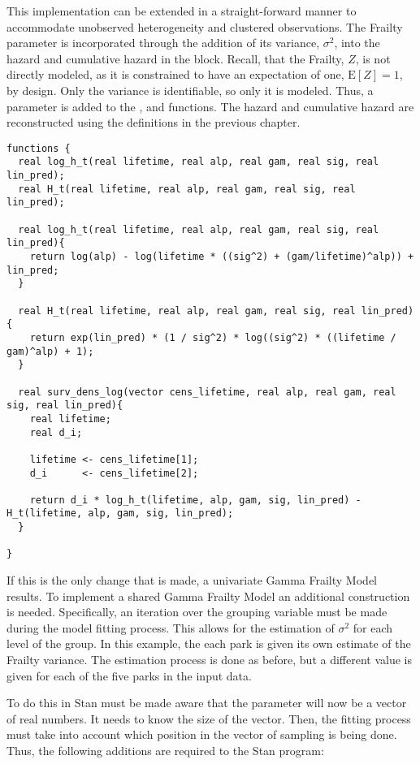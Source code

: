 This implementation can be extended in a straight-forward manner to accommodate unobserved heterogeneity and clustered observations. The Frailty parameter is incorporated through the addition of its variance, $\sigma^2$, into the hazard and cumulative hazard in the  block. Recall, that the Frailty, $Z$, is not directly modeled, as it is constrained to have an expectation of one, $\mathrm{E}[Z]=1$, by design. Only the variance is identifiable, so only it is modeled. Thus, a  parameter is added to the ,  and  functions. The hazard and cumulative hazard are reconstructed using the definitions in the previous chapter. 

\begin{lstlisting}
functions {
  real log_h_t(real lifetime, real alp, real gam, real sig, real lin_pred);
  real H_t(real lifetime, real alp, real gam, real sig, real lin_pred);
  
  real log_h_t(real lifetime, real alp, real gam, real sig, real lin_pred){
    return log(alp) - log(lifetime * ((sig^2) + (gam/lifetime)^alp)) + lin_pred;
  }
  
  real H_t(real lifetime, real alp, real gam, real sig, real lin_pred){
    return exp(lin_pred) * (1 / sig^2) * log((sig^2) * ((lifetime / gam)^alp) + 1);
  }
  
  real surv_dens_log(vector cens_lifetime, real alp, real gam, real sig, real lin_pred){
    real lifetime;
    real d_i;
    
    lifetime <- cens_lifetime[1];
    d_i      <- cens_lifetime[2];
  
    return d_i * log_h_t(lifetime, alp, gam, sig, lin_pred) - H_t(lifetime, alp, gam, sig, lin_pred);
  }

}
\end{lstlisting}


If this is the only change that is made, a univariate Gamma Frailty Model results. To implement a shared Gamma Frailty Model an additional construction is needed. Specifically, an iteration over the grouping variable must be made during the model fitting process. This allows for the estimation of $\sigma^2$ for each level of the group. In this example, the each park is given its own estimate of the Frailty variance. The estimation process is done as before, but a different value is given for each of the five parks in the input data.

To do this in Stan must be made aware that the parameter  will now be a vector of real numbers. It needs to know the size of the vector. Then, the fitting process must take into account which position in the vector of  sampling is being done. Thus, the following additions are required to the Stan program:


